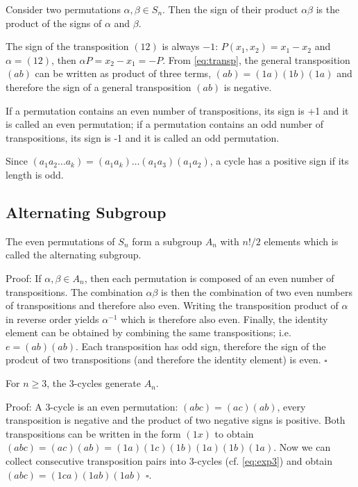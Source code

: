 Consider two permutations \(\alpha, \beta \in S_n\). Then the sign of
their product \(\alpha \beta\) is the product of the signs of \(\alpha\)
and \(\beta\).

The sign of the transposition \((12)\) is always \(-1\):
\(P(x_1, x_2) = x_1 - x_2\) and \(\alpha = (12)\), then
\(\alpha P = x_2 - x_1 = -P\). From \eqref{eq:transp}, the general
transposition \((ab)\) can be written as product of three terms,
\((a b) = (1 a)(1 b)(1 a)\) and therefore the sign of a general
transposition \((ab)\) is negative.

If a permutation contains an even number of transpositions, its sign is
+1 and it is called an even permutation; if a permutation contains an
odd number of transpositions, its sign is -1 and it is called an odd
permutation.

Since \((a_1 a_2 \ldots a_k) = (a_1 a_k) \ldots (a_1 a_3)(a_1 a_2)\), a
cycle has a positive sign if its length is odd.

\subsection{Alternating Subgroup}\label{alternating-subgroup}

The even permutations of \(S_n\) form a subgroup \(A_n\) with \(n!/2\)
elements which is called the alternating subgroup.

Proof: If \(\alpha, \beta \in A_n\), then each permutation is composed
of an even number of transpositions. The combination \(\alpha \beta\) is
then the combination of two even numbers of transpositions and therefore
also even. Writing the transposition product of \(\alpha\) in reverse
order yields \(\alpha^{-1}\) which is therefore also even. Finally, the
identity element can be obtained by combining the same transpositions;
i.e. \(e = (ab)(ab)\). Each transposition has odd sign, therefore the
sign of the prodcut of two transpositions (and therefore the identity
element) is even. \(\square\)

For \(n \geq 3\), the 3-cycles generate \(A_n\).

Proof: A 3-cycle is an even permutation: \((abc) = (ac)(ab)\), every
transposition is negative and the product of two negative signs is
positive. Both transpositions can be written in the form \((1x)\) to
obtain \((abc) = (ac)(ab) = (1a)(1c)(1b)(1a)(1b)(1a)\). Now we can
collect consecutive transposition pairs into 3-cycles (cf.
\eqref{eq:exp3}) and obtain \((abc) = (1ca)(1ab)(1ab)\) \(\square\).

